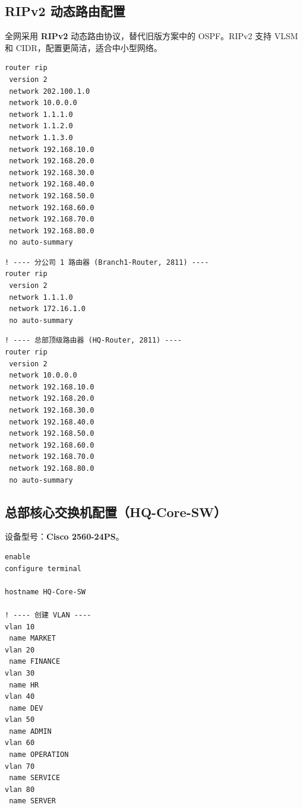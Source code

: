 \documentclass[12pt,a4paper]{ctexart}
\begin{document}
\subsection{RIPv2 动态路由配置}

全网采用 \textbf{RIPv2} 动态路由协议，替代旧版方案中的 OSPF。RIPv2 支持 VLSM 和 CIDR，配置更简洁，适合中小型网络。

\begin{lstlisting}[caption={Core-Router RIPv2 路由配置}, label={lst:rip-core}]
router rip
 version 2
 network 202.100.1.0
 network 10.0.0.0
 network 1.1.1.0
 network 1.1.2.0
 network 1.1.3.0
 network 192.168.10.0
 network 192.168.20.0
 network 192.168.30.0
 network 192.168.40.0
 network 192.168.50.0
 network 192.168.60.0
 network 192.168.70.0
 network 192.168.80.0
 no auto-summary
\end{lstlisting}

\begin{lstlisting}[caption={Branch-Router RIPv2 配置（以分公司1为例）}, label={lst:rip-branch}]
! ---- 分公司 1 路由器 (Branch1-Router, 2811) ----
router rip
 version 2
 network 1.1.1.0
 network 172.16.1.0
 no auto-summary
\end{lstlisting}

\begin{lstlisting}[caption={总部顶级路由器 RIPv2 配置}, label={lst:rip-hq}]
! ---- 总部顶级路由器 (HQ-Router, 2811) ----
router rip
 version 2
 network 10.0.0.0
 network 192.168.10.0
 network 192.168.20.0
 network 192.168.30.0
 network 192.168.40.0
 network 192.168.50.0
 network 192.168.60.0
 network 192.168.70.0
 network 192.168.80.0
 no auto-summary
\end{lstlisting}

\subsection{总部核心交换机配置（HQ-Core-SW）}

设备型号：\textbf{Cisco 2560-24PS}。

\begin{lstlisting}[caption={总部核心交换机 VLAN 创建}, label={lst:core-sw-vlan}]
enable
configure terminal

hostname HQ-Core-SW

! ---- 创建 VLAN ----
vlan 10
 name MARKET
vlan 20
 name FINANCE
vlan 30
 name HR
vlan 40
 name DEV
vlan 50
 name ADMIN
vlan 60
 name OPERATION
vlan 70
 name SERVICE
vlan 80
 name SERVER
\end{lstlisting}
\end{document}
